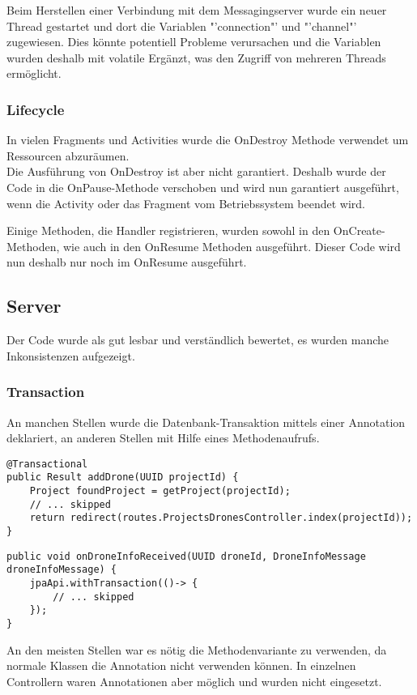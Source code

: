 Beim Herstellen einer Verbindung mit dem Messagingserver wurde ein neuer Thread gestartet und dort die Variablen "'connection"' und "'channel"' zugewiesen.
Dies könnte potentiell Probleme verursachen und die Variablen wurden deshalb mit volatile Ergänzt, was den Zugriff von mehreren Threads ermöglicht.

\subsubsection{Lifecycle}

In vielen Fragments und Activities wurde die OnDestroy Methode verwendet um Ressourcen abzuräumen.\\
Die Ausführung von OnDestroy ist aber nicht garantiert.
Deshalb wurde der Code in die OnPause-Methode verschoben und wird nun garantiert ausgeführt, wenn die Activity oder das Fragment vom Betriebssystem beendet wird.

Einige Methoden, die Handler registrieren, wurden sowohl in den OnCreate-Methoden, wie auch in den OnResume Methoden ausgeführt. Dieser Code wird nun deshalb nur noch im OnResume ausgeführt.

\subsection{Server}

Der Code wurde als gut lesbar und verständlich bewertet, es wurden manche Inkonsistenzen aufgezeigt.

\subsubsection{Transaction}
An manchen Stellen wurde die Datenbank-Transaktion mittels einer Annotation deklariert, an anderen Stellen mit Hilfe eines Methodenaufrufs. 
\begin{lstlisting}
@Transactional
public Result addDrone(UUID projectId) {
    Project foundProject = getProject(projectId);
    // ... skipped
    return redirect(routes.ProjectsDronesController.index(projectId));
}
\end{lstlisting}

\begin{lstlisting}
public void onDroneInfoReceived(UUID droneId, DroneInfoMessage droneInfoMessage) {
    jpaApi.withTransaction(()-> {
        // ... skipped
    });
}
\end{lstlisting}

An den meisten Stellen war es nötig die Methodenvariante zu verwenden, da normale Klassen die Annotation nicht verwenden können. In einzelnen Controllern waren Annotationen aber möglich und wurden nicht eingesetzt.

